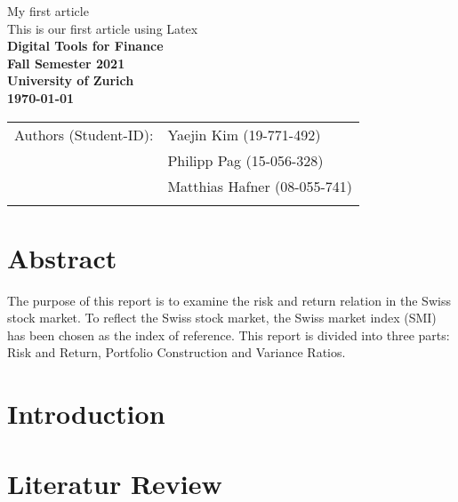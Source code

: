 \documentclass{article}
\begin{document}
\vspace*{3cm}

\begin{center}

\thispagestyle{empty}

{\Huge My first article}\\[0.5cm]
{\LARGE This is our first article using Latex}\\[1.5cm]

{\Large \bf Digital Tools for Finance}\\[1cm]

{\bf \large Fall Semester 2021\\
University of Zurich}\\[1cm]

{\large \bf \today }\\[3cm]


\begin{tabular}{ll}
\hline
{Authors (Student-ID):} & { Yaejin Kim (19-771-492)}\\
& { Philipp Pag (15-056-328)}\\
& { Matthias Hafner (08-055-741) }\\
\hline \\
\end{tabular}



\end{center}


\newpage


\section*{Abstract}
 
The purpose of this report is to examine the risk and return relation in the Swiss stock market. To reflect the Swiss stock market, the Swiss market index (SMI) has been chosen as the index of reference. This report is divided into three parts: Risk and Return, Portfolio Construction and Variance Ratios.

\newpage


\tableofcontents
\newpage

\section{Introduction}
\blindtext
\newpage

\section{Literatur Review}
\blindtext
\newpage
\end{document}
